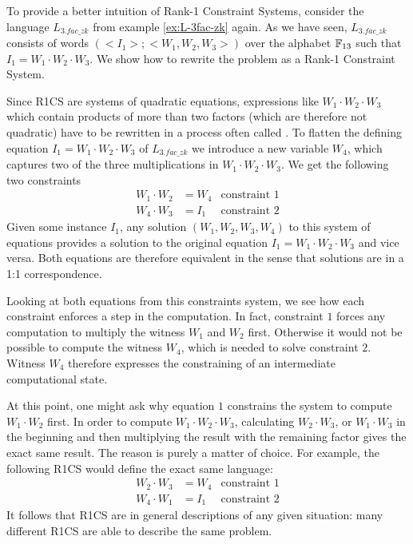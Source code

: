 \begin{example}\label{ex:3-factorization-r1cs} To provide a better intuition of Rank-1 Constraint Systems, consider the language $L_{3.fac\_zk}$ from example \ref{ex:L-3fac-zk} again. As we have seen, $L_{3.fac\_zk}$ consists of words $(<I_1>;<W_1,W_2,W_3>)$ over the alphabet $\mathbb{F}_{13}$ such that $I_1 = W_1\cdot W_2\cdot W_3$. We show how to rewrite the problem as a Rank-1 Constraint System.

Since R1CS are systems of quadratic equations, expressions like $W_1\cdot W_2\cdot W_3$ which contain products of more than two factors (which are therefore not quadratic) have to be rewritten in a process often called . To flatten the defining equation $I_1 = W_1\cdot W_2\cdot W_3$ of $L_{3.fac\_zk}$ we introduce a new variable $W_4$, which captures two of the three multiplications in $W_1\cdot W_2\cdot W_3$. We get the following two constraints
\begin{align*}
W_1 \cdot W_2 & = W_4 & \text{constraint } 1 \\
W_4 \cdot W_3 & = I_1 & \text{constraint } 2
\end{align*}
Given some instance $I_1$, any solution $(W_1,W_2,W_3,W_4)$ to this system of equations provides a solution to the original equation $I_1 = W_1\cdot W_2\cdot W_3$ and vice versa. Both equations are therefore equivalent in the sense that solutions are in a 1:1 correspondence.

Looking at both equations from this constraints system, we see how each constraint enforces a step in the computation. In fact, constraint $1$ forces any computation to multiply the witness $W_1$ and $W_2$ first. Otherwise it would not be possible to compute the witness $W_4$, which is needed to solve constraint $2$. Witness $W_4$ therefore expresses the constraining of an intermediate computational state.

At this point, one might ask why equation $1$ constrains the system to compute $W_1\cdot W_2$ first. In order to compute $W_1\cdot W_2 \cdot W_3$, calculating $W_2\cdot W_3$, or $W_1\cdot W_3$ in the beginning and then multiplying the result with the remaining factor gives the exact same result.  The reason is purely a matter of choice. For example, the following R1CS would define the exact same language:
\begin{align*}
W_2 \cdot W_3 & = W_4 & \text{constraint } 1 \\
W_4 \cdot W_1 & = I_1 & \text{constraint } 2 
\end{align*}
It follows that R1CS are in general  descriptions of any given situation: many different R1CS are able to describe the same problem.


\end{example}
